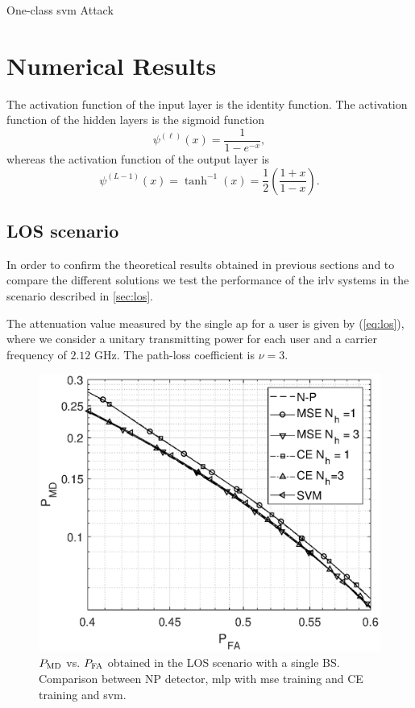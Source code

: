 \documentclass[draftcls,onecolumn,12pt]{IEEEtran}
\begin{document}
\begin{algorithm}[t]
\label{alg:svm}
  \scriptsize

 

    
 \caption{One-class \ac{svm} Attack}
\end{algorithm}


\section{Numerical Results}

The activation function of the input layer is the identity function. The activation function of the hidden layers is the sigmoid function
\begin{equation}
\psi^{(\ell)}(x) = \frac{1}{1-e^{-x}},
\end{equation}
whereas the activation function of the output layer is 
\begin{equation}
\psi^{(L-1)}(x)=\tanh^{-1}(x) = \frac{1}{2} \left( \frac{1+x}{1-x} \right).
\end{equation}

\subsection{LOS scenario}\label{sec:res_los}
In order to confirm the theoretical results obtained in previous sections and to compare the different solutions we test the performance of the \ac{irlv} systems in the scenario described in \ref{sec:los}.

The attenuation value measured by the single \ac{ap} for a user is given by (\ref{eq:los}), where we consider a unitary transmitting power for each user and a carrier frequency of $2.12$ GHz. The path-loss coefficient is $\nu=3$. 
\begin{figure}[h]
    \centering
    \includegraphics[width=0.5\columnwidth]{res_com_CE_MSE_SVM.eps}
    \caption{$P_{\rm MD}$ vs. $P_{\rm FA}$ obtained in the LOS scenario with a single BS. Comparison between NP detector, \ac{mlp} with \ac{mse} training and CE training and \ac{svm}.}
    \label{fig:ceVSmse}
\end{figure}
\end{document}
